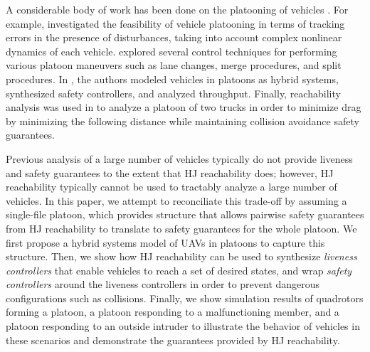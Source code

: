 A considerable body of work has been done on the platooning of vehicles \cite{Kavathekar11}. For example, \cite{McMahon90} investigated the feasibility of vehicle platooning in terms of tracking errors in the presence of disturbances, taking into account complex nonlinear dynamics of each vehicle.  \cite{Hedrick92} explored several control techniques for performing various platoon maneuvers such as lane changes, merge procedures, and split procedures. In \cite{Lygeros98}, the authors modeled vehicles in platoons as hybrid systems, synthesized safety controllers, and analyzed throughput. Finally, reachability analysis was used in \cite{Alam11} to analyze a platoon of two trucks in order to minimize drag by minimizing the following distance while maintaining collision avoidance safety guarantees.

Previous analysis of a large number of vehicles typically do not provide liveness and safety guarantees to the extent that HJ reachability does; however, HJ reachability typically cannot be used to tractably analyze a large number of vehicles. %
In this paper, we attempt to reconciliate this trade-off by assuming a single-file platoon, which provides structure that allows pairwise safety guarantees from HJ reachability to translate to safety guarantees for the whole platoon. We first propose a hybrid systems model of UAVs in platoons to capture this structure. Then, we show how HJ reachability can be used to synthesize \textit{liveness controllers} that enable vehicles to reach a set of desired states, and wrap \textit{safety controllers} around the liveness controllers in order to prevent dangerous configurations such as collisions. Finally, we show simulation results of quadrotors forming a platoon, a platoon responding to a malfunctioning member, and a platoon responding to an outside intruder to illustrate the behavior of vehicles in these scenarios and demonstrate the guarantees provided by HJ reachability.

